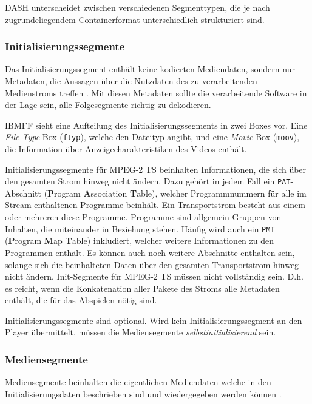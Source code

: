 \documentclass[paper = a4, fontsize = 12pt, parskip = half]{scrartcl} %
\def\attr#1{\texttt{#1}}
\begin{document}
DASH unterscheidet zwischen verschiedenen Segmenttypen, die je nach zugrundeliegendem Containerformat unterschiedlich strukturiert sind.

\subsubsection{Initialisierungssegmente}
Das Initialisierungssegment enthält keine kodierten Mediendaten, sondern nur Metadaten, die Aussagen über die Nutzdaten des zu verarbeitenden Medienstroms treffen \cite{international_organization_for_standardization_isoiec_nodate}. Mit diesen Metadaten sollte die verarbeitende Software in der Lage sein, alle Folgesegmente richtig zu dekodieren.

IBMFF sieht eine Aufteilung des Initialisierungssegments in zwei Boxes vor. Eine \textit{File-Type}-Box (\attr{ftyp}), welche den Dateityp angibt, und eine \textit{Movie}-Box (\attr{moov}), die Information über Anzeigecharakteristiken des Videos enthält.

Initialisierungssegmente für MPEG-2 TS beinhalten Informationen, die sich über den gesamten Strom hinweg nicht ändern. Dazu gehört in jedem Fall ein \attr{PAT}-Abschnitt (\textbf{P}rogram \textbf{A}ssociation \textbf{T}able), welcher Programmnummern für alle im Stream enthaltenen Programme beinhält. Ein Transportstrom besteht aus einem oder mehreren diese Programme. Programme sind allgemein Gruppen von Inhalten, die miteinander in Beziehung stehen. Häufig wird auch ein \attr{PMT} (\textbf{P}rogram \textbf{M}ap \textbf{T}able) inkludiert, welcher weitere Informationen zu den Programmen enthält. Es können auch noch weitere Abschnitte enthalten sein, solange sich die beinhalteten Daten über den gesamten Transportstrom hinweg nicht ändern.
Init-Segmente für MPEG-2 TS müssen nicht vollständig sein. D.h. es reicht, wenn die Konkatenation aller Pakete des Stroms alle Metadaten enthält, die für das Abspielen nötig sind.

Initialisierungssegmente sind optional. Wird kein Initialisierungssegment an den Player übermittelt, müssen die Mediensegmente \textit{selbstinitialisierend} sein.

\subsubsection{Mediensegmente}
Mediensegmente beinhalten die eigentlichen Mediendaten welche in den Initialisierungsdaten beschrieben sind und wiedergegeben werden können \cite{international_organization_for_standardization_isoiec_nodate}.
\end{document}
